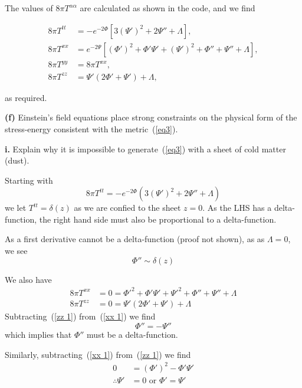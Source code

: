 \documentclass[a4paper]{article} %
\begin{document}
The values of $8\pi T^{\alpha\alpha}$ are calculated as shown in the code, and we find

\begin{align}
8\pi T^{tt}&=-e^{-2\Phi}[3(\Psi')^2+2\Psi''+\Lambda],\\
8\pi T^{xx}&=e^{-2\Psi}[(\Phi')^2+\Phi' \Psi' + (\Psi')^2+\Phi'' + \Psi'' + \Lambda],\\
8\pi T^{yy}&=8\pi T^{xx},\\
8\pi T^{zz}&=\Psi'(2\Phi' + \Psi')+\Lambda,
\end{align}

as required.



\begin{framed}
\textbf{(f)} Einstein’s field equations place strong constraints on the physical form of the
stress-energy consistent with the metric~(\ref{eq3}).
\end{framed}

\begin{framed}
\textbf{i.} Explain why it is impossible to generate~(\ref{eq3}) with a sheet of cold matter (dust).
\end{framed}

Starting with
\begin{equation}
8\pi T^{tt}=-e^{-2\Phi}\left(3(\Psi')^2+2\Psi''+\Lambda\right)
\end{equation}
we let $T^{tt}=\delta(z)$ as we are confied to the sheet $z=0$. As the LHS has a delta-function, the right hand side must also be proportional to a delta-function.

As a first derivative cannot be a delta-function (proof not shown), as as $\Lambda=0$, we see
\begin{equation}
\Phi''\sim \delta(z)
\end{equation}

We also have
\begin{align}
8\pi T^{xx}&=0=\Phi'^2+\Phi'\Psi'+\Psi'^2+\Phi'' + \Psi'' + \Lambda \label{xx 1}\\
8\pi T^{zz}&=0=\Psi'(2\Phi' + \Psi') + \Lambda \label{zz 1}
\end{align}
Subtracting~(\ref{zz 1}) from~(\ref{xx 1}) we find
\begin{equation}
\Phi'' = -\Psi''
\end{equation}
which implies that $\Phi''$ must be a delta-function.

Similarly, subtracting~(\ref{xx 1}) from~(\ref{zz 1}) we find
\begin{align}
0&=(\Phi')^2-\Phi' \Psi'\\
\therefore \Psi'&=0 \text{ or } \Phi'=\Psi'
\end{align}
\end{document}
